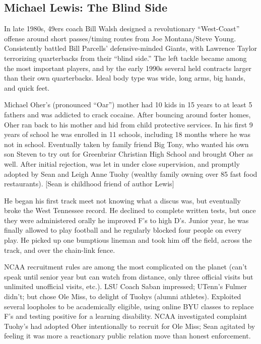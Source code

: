 \documentclass[
]{article}
\begin{document}
\hypertarget{michael-lewis-the-blind-side}{%
\subsection{Michael Lewis: The Blind
Side}\label{michael-lewis-the-blind-side}}

In late 1980s, 49ers coach Bill Walsh designed a revolutionary
``West-Coast'' offense around short passes/timing routes from Joe
Montana/Steve Young. Consistently battled Bill Parcells'
defensive-minded Giants, with Lawrence Taylor terrorizing quarterbacks
from their ``blind side.'' The left tackle became among the most
important players, and by the early 1990s several held contracts larger
than their own quarterbacks. Ideal body type was wide, long arms, big
hands, and quick feet.

Michael Oher's (pronounced ``Oar'') mother had 10 kids in 15 years to at
least 5 fathers and was addicted to crack cocaine. After bouncing around
foster homes, Oher ran back to his mother and hid from child protective
services. In his first 9 years of school he was enrolled in 11 schools,
including 18 months where he was not in school. Eventually taken by
family friend Big Tony, who wanted his own son Steven to try out for
Greenbriar Christian High School and brought Oher as well. After initial
rejection, was let in under close supervision, and promptly adopted by
Sean and Leigh Anne Tuohy (wealthy family owning over 85 fast food
restaurants). {[}Sean is childhood friend of author Lewis{]}

He began his first track meet not knowing what a discus was, but
eventually broke the West Tennessee record. He declined to complete
written tests, but once they were administered orally he improved F's to
high D's. Junior year, he was finally allowed to play football and he
regularly blocked four people on every play. He picked up one bumptious
lineman and took him off the field, across the track, and over the
chain-link fence.

NCAA recruitment rules are among the most complicated on the planet
(can't speak until senior year but can watch from distance, only three
official visits but unlimited unofficial visits, etc.). LSU Coach Saban
impressed; UTenn's Fulmer didn't; but chose Ole Miss, to delight of
Tuohys (alumni athletes). Exploited several loopholes to be academically
eligible, using online BYU classes to replace F's and testing positive
for a learning disability. NCAA investigated complaint Tuohy's had
adopted Oher intentionally to recruit for Ole Miss; Sean agitated by
feeling it was more a reactionary public relation move than honest
enforcement.
\end{document}
